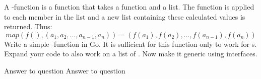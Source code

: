 \begin{Exercise}[title={Map function},difficulty=4]
\label{ex:map function}
A -function is a function that takes
a function and a list. The function is applied to 
each member in the list and a new list containing
these calculated values is returned.
Thus: 
$$ map(f(), (a_1,a_2,\ldots,a_{n-1},a_n)) =  (f(a_1), f(a_2),\ldots,f(a_{n-1}), f(a_n)) $$
\Question \label{ex:map function q1} Write a simple
-function in Go. It is sufficient
for this function only to work for s.
\Question \label{ex:map function q2} Expand your code to also work on a list of .
\Question \label{ex:map funtion q3} Now make it generic using interfaces.

\end{Exercise}

\begin{Answer}

\Question


\Question Answer to question 
\Question Answer to question
\end{Answer}


